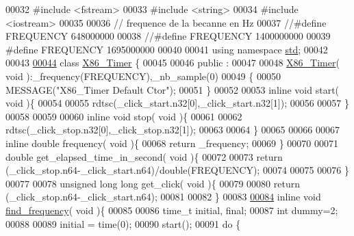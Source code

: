 \begin{DoxyCode}
00032 \textcolor{preprocessor}{#include <fstream>}
00033 \textcolor{preprocessor}{#include <string>}
00034 \textcolor{preprocessor}{#include <iostream>}
00035 
00036 \textcolor{comment}{// frequence de la becanne en Hz}
00037 \textcolor{comment}{//#define FREQUENCY 648000000}
00038 \textcolor{comment}{//#define FREQUENCY 1400000000}
00039 \textcolor{preprocessor}{#define FREQUENCY 1695000000}
00040 
00041 \textcolor{keyword}{using namespace }\hyperlink{namespacestd}{std};
00042 
00043 
\hyperlink{class_x86___timer}{00044} \textcolor{keyword}{class }\hyperlink{class_x86___timer}{X86\_Timer} \{
00045 
00046 public :
00047 
00048   \hyperlink{class_x86___timer}{X86\_Timer}( \textcolor{keywordtype}{void} ):\_frequency(FREQUENCY),\_nb\_sample(0)
00049   \{
00050     MESSAGE(\textcolor{stringliteral}{"X86\_Timer Default Ctor"});    
00051   \}
00052 
00053   \textcolor{keyword}{inline} \textcolor{keywordtype}{void} start( \textcolor{keywordtype}{void} )\{
00054 
00055     rdtsc(\_click\_start.n32[0],\_click\_start.n32[1]);
00056 
00057   \}
00058 
00059 
00060   \textcolor{keyword}{inline} \textcolor{keywordtype}{void} stop( \textcolor{keywordtype}{void} )\{
00061 
00062     rdtsc(\_click\_stop.n32[0],\_click\_stop.n32[1]);
00063 
00064   \}
00065   
00066 
00067   \textcolor{keyword}{inline} \textcolor{keywordtype}{double} frequency( \textcolor{keywordtype}{void} )\{
00068     \textcolor{keywordflow}{return} \_frequency;
00069   \}
00070 
00071   \textcolor{keywordtype}{double} get\_elapsed\_time\_in\_second( \textcolor{keywordtype}{void} )\{
00072 
00073     \textcolor{keywordflow}{return} (\_click\_stop.n64-\_click\_start.n64)/double(FREQUENCY);
00074 
00075 
00076   \}    
00077 
00078   \textcolor{keywordtype}{unsigned} \textcolor{keywordtype}{long} \textcolor{keywordtype}{long}  get\_click( \textcolor{keywordtype}{void} )\{
00079     
00080     \textcolor{keywordflow}{return} (\_click\_stop.n64-\_click\_start.n64);
00081 
00082   \}    
00083 
\hyperlink{class_x86___timer_a1beddd8cb10ed89d3dd06d3b233b63e1}{00084}   \textcolor{keyword}{inline} \textcolor{keywordtype}{void} \hyperlink{class_x86___timer_a1beddd8cb10ed89d3dd06d3b233b63e1}{find\_frequency}( \textcolor{keywordtype}{void} )\{
00085 
00086     time\_t initial, \textcolor{keyword}{final};
00087     \textcolor{keywordtype}{int} dummy=2;
00088 
00089     initial = time(0);
00090     start();
00091     \textcolor{keywordflow}{do} \{

\end{DoxyCode}
